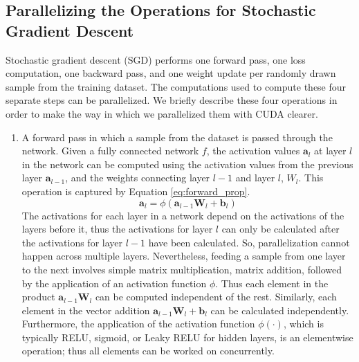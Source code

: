 \documentclass[11pt,a4paper]{article}
\begin{document}
\subsection{Parallelizing the Operations for Stochastic Gradient Descent} \label{training_steps}
Stochastic gradient descent (SGD) performs one forward pass, one loss computation, one backward pass, and one weight update per randomly drawn sample from the training dataset. The computations used to compute these four separate steps can be parallelized. We briefly describe these four operations in order to make the way in which we parallelized them with CUDA clearer.
\begin{enumerate}
    \item A forward pass in which a sample from the dataset is passed through the network. Given a fully connected network $f$, the activation values $\bm{a}_l$ at layer $l$ in the network can be computed using the activation values from the previous layer $\bm{a}_{l-1}$, and the weights connecting layer $l-1$ and layer $l$, $W_l$. This operation is captured by Equation \ref{eq:forward_prop}. 
    \begin{equation} \label{eq:forward_prop}
        \bm{a}_l = \phi(\bm{a}_{l-1} \bm{W}_l + \bm{b}_{l})
    \end{equation}
    \indent The activations for each layer in a network depend on the activations of the layers before it, thus the activations for layer $l$ can only be calculated after the activations for layer $l-1$ have been calculated. So, parallelization cannot happen across multiple layers. Nevertheless, feeding a sample from one layer to the next involves simple matrix multiplication, matrix addition, followed by the application of an activation function $\phi$. Thus each element in the product $\bm{a}_{l-1} \bm{W}_l$ can be computed independent of the rest. Similarly, each element in the vector addition  $\bm{a}_{l-1} \bm{W}_l + \bm{b}_{l}$ can be calculated independently. Furthermore, the application of the activation function $\phi(\cdot)$, which is typically RELU, sigmoid, or Leaky RELU for hidden layers, is an elementwise operation; thus all elements can be worked on concurrently.
    

\end{enumerate}
\end{document}
